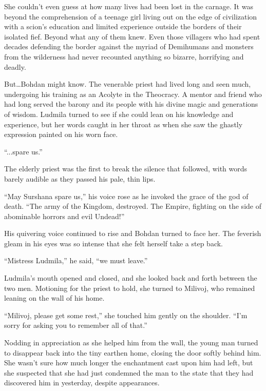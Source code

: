  

She couldn’t even guess at how many lives had been lost in the carnage. It was beyond the comprehension of a teenage girl living out on the edge of civilization with a scion’s education and limited experience outside the borders of their isolated fief. Beyond what any of them knew. Even those villagers who had spent decades defending the border against the myriad of Demihumans and monsters from the wilderness had never recounted anything so bizarre, horrifying and deadly.

 

But…Bohdan might know. The venerable priest had lived long and seen much, undergoing his training as an Acolyte in the Theocracy. A mentor and friend who had long served the barony and its people with his divine magic and generations of wisdom. Ludmila turned to see if she could lean on his knowledge and experience, but her words caught in her throat as when she saw the ghastly expression painted on his worn face.

 

“...spare us.”

 

The elderly priest was the first to break the silence that followed, with words barely audible as they passed his pale, thin lips.

 

“May Surshana spare us,” his voice rose as he invoked the grace of the god of death. “The army of the Kingdom, destroyed. The Empire, fighting on the side of abominable horrors and evil Undead!”

 

His quivering voice continued to rise and Bohdan turned to face her. The feverish gleam in his eyes was so intense that she felt herself take a step back.

 

“Mistress Ludmila,” he said, “we must leave.”

 

Ludmila’s mouth opened and closed, and she looked back and forth between the two men. Motioning for the priest to hold, she turned to Milivoj, who remained leaning on the wall of his home.

 

“Milivoj, please get some rest,” she touched him gently on the shoulder. “I’m sorry for asking you to remember all of that.”

 

Nodding in appreciation as she helped him from the wall, the young man turned to disappear back into the tiny earthen home, closing the door softly behind him. She wasn’t sure how much longer the enchantment cast upon him had left, but she suspected that she had just condemned the man to the state that they had discovered him in yesterday, despite appearances.

